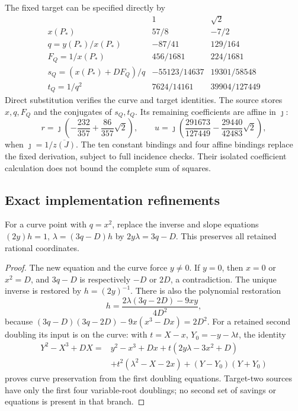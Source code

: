 The fixed target can be specified directly by
\[
 \begin{array}{c|cc}
 &1&\sqrt2\\\hline
 x(P_*)&57/8&-7/2\\
 q=y(P_*)/x(P_*)&-87/41&129/164\\
 F_Q=1/x(P_*)&456/1681&224/1681\\
 s_Q=(x(P_*)+DF_Q)/q&-55123/14637&19301/58548\\
 t_Q=1/q^2&7624/14161&39904/127449
 \end{array}
\]
Direct substitution verifies the curve and target identities. The source
stores $x,q,F_Q$ and the conjugates of $s_Q,t_Q$. Its remaining coefficients
are affine in $\jmath$:
\[
 r=\jmath\left(-\frac{232}{357}+\frac{86}{357}\sqrt2\right),\qquad
 u=\jmath\left(\frac{291673}{127449}-\frac{29440}{42483}\sqrt2\right),
\]
when $\jmath=1/\overline{z(J)}$. The ten constant bindings and four
affine bindings replace the fixed derivation, subject to full incidence
checks. Their isolated coefficient calculation does not bound the complete
sum of squares.



\subsection{Exact implementation refinements}


\begin{lemma}\label{lem:quartic-tangent-fusion}
For a curve point with $q=x^2$, replace the inverse and slope equations
$(2y)h=1$, $\lambda=(3q-D)h$ by
$2y\lambda=3q-D$. This preserves all retained rational coordinates.
\end{lemma}
\begin{proof}
The new equation and the curve force $y\ne0$. If $y=0$, then $x=0$ or
$x^2=D$, and $3q-D$ is respectively $-D$ or $2D$, a contradiction.
The unique inverse is restored by $h=(2y)^{-1}$. There is also the
polynomial restoration
\[
 h=\frac{2\lambda(3q-2D)-9xy}{4D^2},
\]
because $(3q-D)(3q-2D)-9x(x^3-Dx)=2D^2$.
For a retained second doubling its input is on the curve: with
$t=X-x$, $Y_0=-y-\lambda t$, the identity
\begin{align*}
 Y^2-X^3+DX={}&y^2-x^3+Dx+t(2y\lambda-3x^2+D)\\
 &+t^2(\lambda^2-X-2x)+(Y-Y_0)(Y+Y_0)
\end{align*}
proves curve preservation from the first doubling equations. Target-two
sources have only the first four variable-root doublings; no second set
of savings or equations is present in that branch.
\end{proof}





